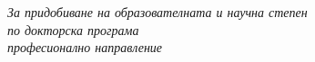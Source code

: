 \begin{titlepage}
\begin{center}
\large 
\textit{За придобиване на образователната и научна степен \degreename\\
по докторска програма \degreeprogramname\\
професионално направление \professionname}\\[0.3cm] %

\vfill

 
\vfill
\end{center}
\end{titlepage}



 
